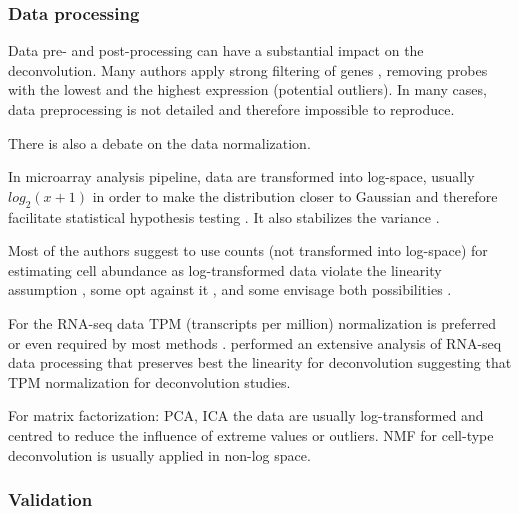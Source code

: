 \documentclass[12pt,]{book}
\theoremstyle{definition}
\theoremstyle{definition}
\theoremstyle{definition}
\theoremstyle{remark}
\begin{document}
\hypertarget{data-processing}{%
\subsubsection{Data processing}\label{data-processing}}

Data pre- and post-processing can have a substantial impact on the
deconvolution. Many authors apply strong filtering of genes
\citep{Wang2016}, removing probes with the lowest and the highest
expression (potential outliers). In many cases, data preprocessing is
not detailed and therefore impossible to reproduce.

There is also a debate on the data normalization.

In microarray analysis pipeline, data are transformed into log-space,
usually \(log_2(x+1)\) in order to make the distribution closer to
Gaussian and therefore facilitate statistical hypothesis testing
\citep{Hoyle2002}. It also stabilizes the variance \citep{Tsai2003}.

Most of the authors suggest to use counts (not transformed into
log-space) for estimating cell abundance as log-transformed data violate
the linearity assumption \citep{Zhong2013}, some opt against it
\citep{Shannon2017, Clarke2010}, and some envisage both possibilities
\citep{Erkkila2010, Repsilber2010}.

For the RNA-seq data TPM (transcripts per million) normalization is
preferred or even required by most methods
\citep{Chen2018, Finotello2017, Racle2017}. \citet{Jin2017} performed an
extensive analysis of RNA-seq data processing that preserves best the
linearity for deconvolution suggesting that TPM normalization for
deconvolution studies.

For matrix factorization: PCA, ICA the data are usually log-transformed
and centred to reduce the influence of extreme values or outliers. NMF
for cell-type deconvolution is usually applied in non-log space.

\hypertarget{Validation}{%
\subsubsection{Validation}\label{Validation}}
\end{document}
